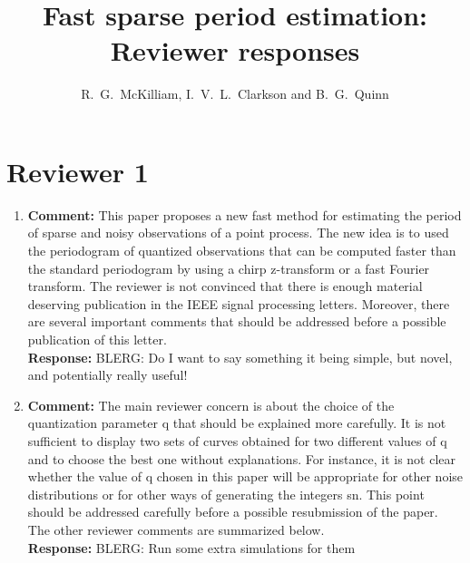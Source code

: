 \documentclass[a4paper,10pt]{article}
\title{Fast sparse period estimation: Reviewer responses}
\author{R.~G.~McKilliam, I.~V.~L.~Clarkson and B.~G.~Quinn 
}
\begin{document}
\maketitle


\section*{Reviewer 1}\label{sec:reviewer-1}

\begin{enumerate}
 
\item\textbf{Comment:}
This paper proposes a new fast method for estimating the period of sparse and noisy
observations of a point process. The new idea is to used the periodogram of quantized
observations that can be computed faster than the standard periodogram by using
a chirp z-transform or a fast Fourier transform. The reviewer is not convinced that
there is enough material deserving publication in the IEEE signal processing letters.
Moreover, there are several important comments that should be addressed before a
possible publication of this letter.
\\
\textbf{Response:}
BLERG: Do I want to say something it being simple, but novel, and potentially really useful!

\item\textbf{Comment:}
The main reviewer concern is about the choice of the quantization parameter
q that should be explained more carefully. It is not suﬃcient to display two sets
of curves obtained for two diﬀerent values of q and to choose the best one without
explanations. For instance, it is not clear whether the value of q chosen in this paper
will be appropriate for other noise distributions or for other ways of generating the
integers sn. This point should be addressed carefully before a possible resubmission
of the paper. The other reviewer comments are summarized below.
\\
\textbf{Response:}
BLERG: Run some extra simulations for them


\end{enumerate}
\end{document}
